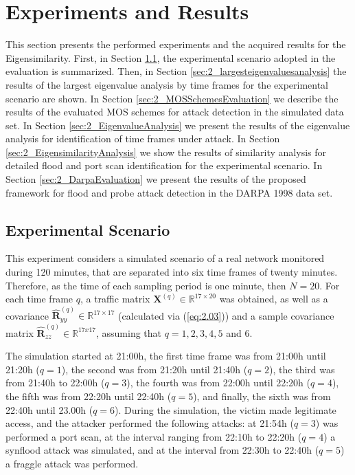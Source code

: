 \section{Experiments and Results}
\label{sec:2_experimentalresults}

This section presents the performed experiments and the acquired results for the Eigensimilarity. First, in Section \ref{sec:2_AnalyzedScenario}, the experimental scenario adopted in the evaluation is summarized. Then, in Section \ref{sec:2_largesteigenvaluesanalysis} the results of the largest eigenvalue analysis by time frames for the experimental scenario are shown. In Section \ref{sec:2_MOSSchemesEvaluation} we describe the results of the evaluated MOS schemes for attack detection in the simulated data set. In Section \ref{sec:2_EigenvalueAnalysis} we present the results of the eigenvalue analysis for identification of time frames under attack. In Section \ref{sec:2_EigensimilarityAnalysis} we show the results of similarity analysis for detailed flood and port scan identification for the experimental scenario. In Section \ref{sec:2_DarpaEvaluation} we present the results of the proposed framework for flood and probe attack detection in the DARPA 1998 data set.


\subsection{Experimental Scenario}
\label{sec:2_AnalyzedScenario}

This experiment considers a simulated scenario of a real network monitored during 120 minutes, that are separated into six time frames of twenty minutes. Therefore, as the time of each sampling period is one minute, then $N = 20$. For each time frame $q$, a traffic matrix $\pmb{X}^{(q)} \in \mathbb{R}^{17 \times 20}$ was obtained, as well as a covariance $\hat{\pmb{R}}_{yy}^{(q)} \in \mathbb{R}^{17 \times 17}$ (calculated via (\ref{eq:2.03})) and a sample covariance matrix $\hat{\pmb{R}}_{zz}^{(q)} \in \mathbb{R}^{17x17}$, assuming that $q = 1, 2, 3, 4, 5$ and $6$. 

The simulation started at 21:00h, the first time frame was from 21:00h until 21:20h ($q = 1$), the second was from 21:20h until 21:40h ($q = 2$), the third was from 21:40h to 22:00h ($q = 3$), the fourth was from 22:00h until 22:20h ($q = 4$), the fifth was from 22:20h until 22:40h ($q = 5$), and finally, the sixth was from 22:40h until 23.00h ($q = 6$). During the simulation, the victim made legitimate access, and the attacker performed the following attacks: at 21:54h ($q = 3$) was performed a port scan, at the interval ranging from 22:10h to 22:20h ($q = 4$) a synflood attack was simulated, and at the interval from 22:30h to 22:40h ($q = 5$) a fraggle attack was performed.

